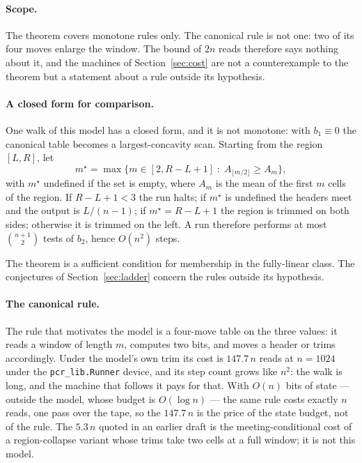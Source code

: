 \documentclass[11pt]{article}
\theoremstyle{remark}
\begin{document}
\paragraph{Scope.} The theorem covers monotone rules only. The canonical rule is not one: two of its
four moves enlarge the window. The bound of $2n$ reads therefore says nothing about it, and the
machines of Section~\ref{sec:cost} are not a counterexample to the theorem but a statement about a
rule outside its hypothesis.

\paragraph{A closed form for comparison.} One walk of this model has a closed form, and it is not
monotone: with $b_1\equiv0$ the canonical table becomes a largest-concavity scan. Starting from the
region $[L,R]$, let
\[
m^{\star}=\max\{m\in[2,R-L+1]\;:\;A_{\lfloor m/2\rfloor}\ge A_m\},
\]
with $m^{\star}$ undefined if the set is empty, where $A_m$ is the mean of the first $m$ cells of the
region. If $R-L+1<3$ the run halts; if $m^{\star}$ is undefined the headers meet and the output is
$L/(n-1)$; if $m^{\star}=R-L+1$ the region is trimmed on both sides; otherwise it is trimmed on the left. A
run therefore performs at most $\binom{n+1}{2}$ tests of $b_2$, hence $O(n^{2})$ steps.

The theorem is a sufficient condition for membership in the fully-linear class. The conjectures of
Section~\ref{sec:ladder} concern the rules outside its hypothesis.

\paragraph{The canonical rule.} The rule that motivates the model is a four-move table on the three
values: it reads a window of length $m$, computes two bits, and moves a header or trims accordingly.
Under the model's own trim its cost is $147.7\,n$ reads at $n=1024$ under the
\texttt{pcr\_lib.Runner} device, and its step count grows like
$n^{2}$: the walk is long, and the machine that follows it pays for that. With $O(n)$ bits of state --- outside the model, whose budget is $O(\log n)$ --- the
same rule costs exactly $n$ reads, one pass over the tape, so the $147.7\,n$ is the price of the state
budget, not of the rule. The $5.3\,n$ quoted in an earlier draft is the meeting-conditional cost of a
region-collapse variant whose trims take two cells at a full window; it is not this model.
\end{document}
